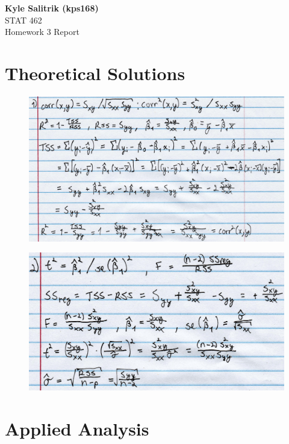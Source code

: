 \documentclass[a4paper, 11pt]{article}
\begin{document}
\graphicspath{{./figures/}}
\noindent
\large\textbf{Kyle Salitrik (kps168)} \\
\normalsize STAT 462\\
\large{Homework 3 Report} \hfill 

\section*{Theoretical Solutions}
\begin{figure}[H]
	\centering
	\includegraphics[width=\textwidth]{t1.jpg}
\end{figure}
\begin{figure}[H]
	\centering
	\includegraphics[width=\textwidth]{t2.jpg}
\end{figure}

\section*{Applied Analysis}
\end{document}
